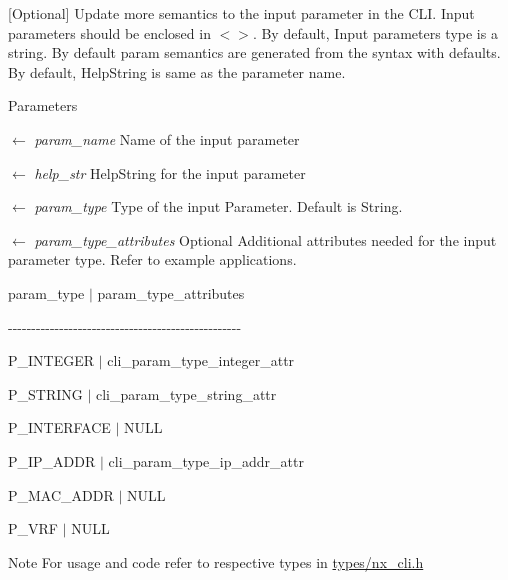\mbox{[}Optional\mbox{]} Update more semantics to the input parameter in the CLI. Input parameters should be enclosed in $<$$>$. By default, Input parameters type is a string. By default param semantics are generated from the syntax with defaults. By default, HelpString is same as the parameter name. 
\begin{DoxyParams}{Parameters}
\item[\mbox{$\leftarrow$} {\em param\_\-name}]Name of the input parameter \item[\mbox{$\leftarrow$} {\em help\_\-str}]HelpString for the input parameter \item[\mbox{$\leftarrow$} {\em param\_\-type}]Type of the input Parameter. Default is String. \item[\mbox{$\leftarrow$} {\em param\_\-type\_\-attributes}]Optional Additional attributes needed for the input parameter type. Refer to example applications. \par
 param\_\-type $|$ param\_\-type\_\-attributes \par
 -\/-\/-\/-\/-\/-\/-\/-\/-\/-\/-\/-\/-\/-\/-\/-\/-\/-\/-\/-\/-\/-\/-\/-\/-\/-\/-\/-\/-\/-\/-\/-\/-\/-\/-\/-\/-\/-\/-\/-\/-\/-\/-\/-\/-\/-\/-\/-\/-\/-\/ \par
 P\_\-INTEGER $|$ cli\_\-param\_\-type\_\-integer\_\-attr \par
 P\_\-STRING $|$ cli\_\-param\_\-type\_\-string\_\-attr \par
 P\_\-INTERFACE $|$ NULL \par
 P\_\-IP\_\-ADDR $|$ cli\_\-param\_\-type\_\-ip\_\-addr\_\-attr \par
 P\_\-MAC\_\-ADDR $|$ NULL \par
 P\_\-VRF $|$ NULL \par
\par
\end{DoxyParams}
\begin{DoxyNote}{Note}
For usage and code refer to respective types in \hyperlink{types_2nx__cli_8h_source}{types/nx\_\-cli.h} 
\end{DoxyNote}

